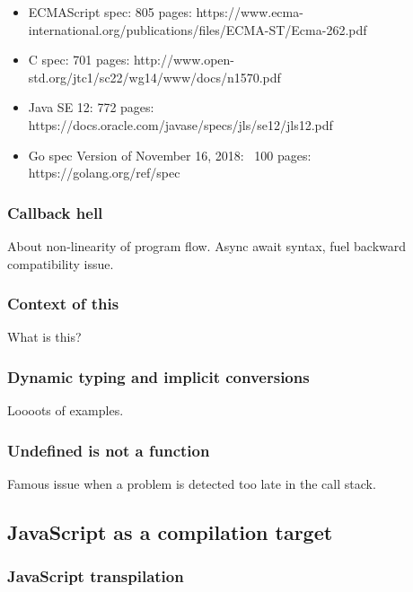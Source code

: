\begin{itemize}
	\item ECMAScript spec: 805 pages: https://www.ecma-international.org/publications/files/ECMA-ST/Ecma-262.pdf
	\item C spec: 701 pages: http://www.open-std.org/jtc1/sc22/wg14/www/docs/n1570.pdf
	\item Java SE 12: 772 pages: https://docs.oracle.com/javase/specs/jls/se12/jls12.pdf
	\item Go spec Version of November 16, 2018: ~100 pages: https://golang.org/ref/spec
\end{itemize}

\subsubsection{Callback hell}%
\label{ssub:callback_hell}

About non-linearity of program flow.
Async await syntax, fuel backward compatibility issue.

\subsubsection{Context of this}%
\label{ssub:context_of_this}

What is this?

\subsubsection{Dynamic typing and implicit conversions}%
\label{ssub:dynamic_typing_and_implicit_conversions}

Loooots of examples.

\subsubsection{Undefined is not a function}%
\label{ssub:undefined_is_not_a_function}

Famous issue when a problem is detected too late in the call stack.


\subsection{JavaScript as a compilation target}%
\label{sub:javascript_as_a_compilation_target}


\subsubsection{JavaScript transpilation}%
\label{ssub:javascript_transpilation}

